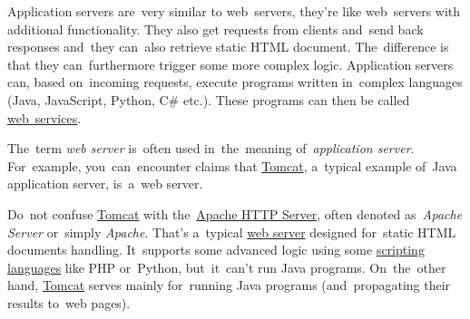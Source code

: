 \label{applicationserver}
Application servers are~very similar to web~servers, they're like web~servers with additional functionality.
They also get requests from clients and~send back responses and~they can~also retrieve static HTML document.
The~difference is that they can~furthermore trigger some more complex logic.
Application servers can, based on~incoming requests, execute programs written in~complex languages (Java, JavaScript, Python, C\# etc.).
These programs can then be called \hyperref[webserviceapplication]{web~services}.

\warning The~term \textit{web server} is~often used in~the~meaning of~\textit{application server}.
For~example, you~can~encounter claims that \hyperref[tomcat]{Tomcat}, a~typical example of~Java application server, is~a~web server.

\warning Do~not confuse \hyperref[tomcat]{Tomcat} with the~\href{https://en.wikipedia.org/wiki/Apache_HTTP_Server}{Apache HTTP Server}, often denoted as~\textit{Apache Server} or~simply \textit{Apache}.
That's a~typical \hyperref[webserver]{web server} designed for~static HTML documents handling.
It~supports some advanced logic using some \hyperref[scriptinglanguages]{scripting languages} like PHP or~Python, but~it~can't run Java programs.
On~the~other hand, \hyperref[tomcat]{Tomcat} serves mainly for~running Java programs (and~propagating their results to~web pages).

\label{dns}

\label{rest}
